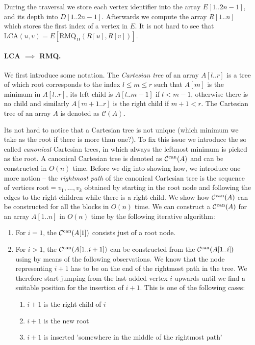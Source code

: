 During the traversal we store each vertex identifier into the array $E[1..2n-1]$, and its depth into $D[1..2n-1]$. Afterwards we compute the array $R[1..n]$ which stores the first index of a vertex in $E$. It is not hard to see that $\text{LCA}(u, v) = E[\text{RMQ}_D(R[u], R[v])]$.

\paragraph{LCA $\implies$ RMQ.}
We first introduce some notation. The \textit{Cartesian tree} of an array $A[l..r]$ is a tree of which root corresponds to the index $l \leq m \leq r$ such that $A[m]$ is the minimum in $A[l..r]$, its left child is $A[l..m-1]$ if $l < m-1 $, otherwise there is no child and similarly $A[m+1..r]$ is the right child if $m+1 < r$.
The Cartesian tree of an array $A$ is denoted as $\mathcal{C}(A)$.

Its not hard to notice that a Cartesian tree is not unique (which minimum we take as the root if there is more than one?).
To fix this issue we introduce the so called \textit{canonical} Cartesian trees, in which always the leftmost minimum is picked as the root.
A canonical Cartesian tree is denoted as $\mathcal{C}^{\text{can}}(A)$ and can be constructed in $O(n)$ time.
Before we dig into showing how, we introduce one more notion -- the \textit{rightmost path} of the canonical Cartesian tree is the sequence of vertices $\text{root} = v_1, \ldots, v_k$ obtained by starting in the root node and following the edges to the right children while there is a right child.
We show how $\mathcal{C}^{\text{can}}(A)$ can be constructed for all the blocks in $O(n)$ time.
We can construct a $\mathcal{C}^{\text{can}}(A)$ for an array $A[1..n]$ in $O(n)$ time by the following iterative algorithm:
\begin{enumerate}
    \item For $i = 1$, the $\mathcal{C}^{\text{can}}(A[1])$ consists just of a root node.
    \item For $i > 1$, the $\mathcal{C}^{\text{can}}(A[1..i+1])$ can be constructed from the $\mathcal{C}^{\text{can}}(A[1..i])$ using by means of the following observations. We know that the node representing $i+1$ has to be on the end of the rightmost path in the tree. We therefore start jumping from the last added vertex $i$ upwards until we find a suitable position for the insertion of $i+1$. This is one of the following cases:
    \begin{enumerate}
        \item $i+1$ is the right child of $i$
        \item $i+1$ is the new root
        \item $i+1$ is inserted 'somewhere in the middle of the rightmost path' 
    \end{enumerate}
\end{enumerate}

